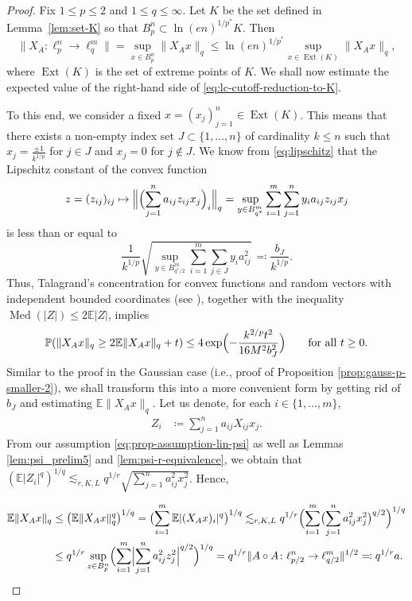 \documentclass[a4paper]{amsart}
\theoremstyle{definition}
\theoremstyle{remark}
\numberwithin{equation}{section}
\newcommand*{\EE}{\mathbb{E}}
\newcommand*{\PP}{\mathbb{P}}
\newcommand*{\hadprod}{\mathbin{\circ}} %
\newcommand*{\Ext}{\operatorname{Ext}} %
\begin{document}
\begin{proof}
		Fix $1\leq p\leq 2$ and $1\leq q\leq \infty$.
	Let $K$ be the set defined in Lemma~\ref{lem:set-K}
	so that $B_p^n\subset \ln(en)^{1/p^*} K$.
	Then
	\begin{equation}
	\label{eq:lc-cutoff-reduction-to-K}
	\|X_A \colon \ell^n_p\to \ell^m_q\|
	=  \sup_{x\in B_p^n} \|X_A x\|_q
	\leq  \ln(en)^{1/p^*}\! \sup_{x\in \Ext (K)}\! \|X_A x\|_q,
	\end{equation}
	where  $\Ext(K)$ is the set of  extreme points of $K$.
	We shall now estimate the expected value of the right-hand side of \eqref{eq:lc-cutoff-reduction-to-K}.
	
	
	To this end, we consider a fixed $x=(x_j)_{j=1}^n \in \Ext(K)$.
	This means that there exists a non-empty index set $J\subset \{1,\dots,n\}$ of cardinality $k\leq n$ such that $x_j = \frac{\pm 1}{k^{1/p}}$ for $j\in J$ and $x_j=0$ for $j\notin J$. We know from \eqref{eq:lipschitz} that the Lipschitz constant of the convex function
	\[
		z=(z_{ij})_{ij} \mapsto \Bigl\| \Bigl( \sum_{j=1}^n a_{ij}z_{ij} x_j \Bigr)_i \Bigr\|_q = \sup_{y\in B_{q^*}^m}\sum_{i=1}^m \sum_{j=1}^n y_ia_{ij}z_{ij}x_j
	\]	
	is less than or equal to
	\[
		 \frac{1}{k^{1/p}}\sqrt{ \sup_{y\in B^m_{q^*/2}}  \sum_{i=1}^m  \sum_{j\in J} y_i a_{ij}^2  }\,
    		\eqqcolon  \frac{ b_J}{k^{1/p}}.
	\]
	Thus, Talagrand's concentration for convex functions and random vectors with  independent bounded coordinates (see \cite[Theorem 6.6 and Equation (6.18)]{Talagrand96}), together with the inequality $\operatorname{Med}(|Z|)\leq 2\EE |Z|$, implies
	\begin{equation}	\label{eq:lc-cutoff-norm-concentration-claim}
		\PP (\|X_Ax\|_q \ge 2\EE \|X_Ax\|_q + t) \le 4\exp\Bigl(-\frac{k^{2/p}t^2}{16M^2b_J^2}\Bigr) \qquad \text{for all } t\ge 0.
	\end{equation}
Similar to the proof in the Gaussian case (i.e., proof of Proposition \ref{prop:gauss-p-smaller-2}), we shall transform this into a more convenient form
by getting rid of $b_J$
and
estimating  $\EE \|X_A x\|_q $. Let us denote, for each $i\in\{1,\dots,m\}$,
	\begin{align*}
	Z_i
	       &\coloneqq  \sum_{j=1}^n a_{ij}X_{ij} x_j.
	\end{align*}
From our assumption \eqref{eq:prop-assumption-lin-psi} as well as
 Lemmas \ref{lem:psi_prelim5} and \ref{lem:psi-r-equivalence}, we obtain that   $(\EE|Z_i|^q)^{1/q}\lesssim_{r,K,L}q^{1/r}\sqrt{\sum_{j=1}^n a_{ij}^2 x_j^2}$. Hence,

\begin{align*}	
	\EE \|X_A x\|_q
	& \leq \bigl(\EE \|X_Ax\|_q^q\bigr)^{1/q}
	= \bigl(\sum_{i=1}^m \EE |(X_Ax)_i|^q\bigr)^{1/q} 	
	\lesssim_{r,K,L} q^{1/r} \Bigl( \sum_{i=1}^m \bigl(\sum_{j=1}^n a_{ij}^2 x_j^2\bigr)^{q/2}  \Bigr)^{1/q} \\
	& \leq   q^{1/r}  \sup_{z\in B_p^n} \Bigl( \sum_{i=1}^m \Bigl| \sum_{j=1}^n a_{ij}^2 z_j^2\Bigr|^{q/2}\Bigr)^{1/q}
 	 =  q^{1/r} \|A\hadprod A \colon \ell^n_{p/2} \to \ell^m_{q/2}\|^{1/2}  \eqqcolon q^{1/r} a.
\end{align*}


\end{proof}
\end{document}
